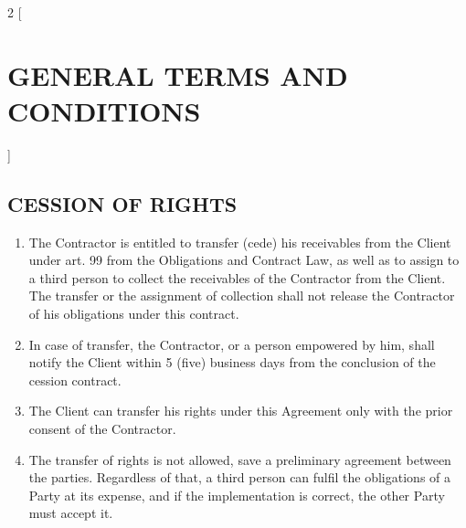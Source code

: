 \begin{multicols}{2} [\section{GENERAL TERMS AND CONDITIONS}]
      \subsection{CESSION OF RIGHTS}
      \begin{enumerate}
      \item The Contractor is entitled to transfer (cede) his
        receivables from the Client under art. 99 from the Obligations
        and Contract Law, as well as to assign to a third person to
        collect the receivables of the Contractor from the Client. The
        transfer or the assignment of collection shall not release the
        Contractor of his obligations under this contract.
      \item In case of transfer, the Contractor, or a person empowered
        by him, shall notify the Client within 5 (five) business days
        from the conclusion of the cession contract.
      \item The Client can transfer his rights under this Agreement
        only with the prior consent of the Contractor.
      \item The transfer of rights is not allowed, save a preliminary
        agreement between the parties. Regardless of that, a third
        person can fulfil the obligations of a Party at its expense,
        and if the implementation is correct, the other Party must
        accept it.
      \end{enumerate}


\end{multicols}

